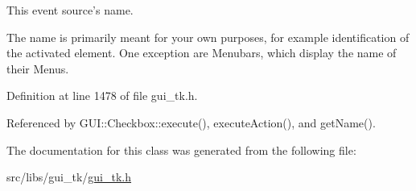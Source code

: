 This event source's name. 

The name is primarily meant for your own purposes, for example identification of the activated element. One exception are Menubars, which display the name of their Menus. 

Definition at line 1478 of file gui\-\_\-tk.\-h.



Referenced by G\-U\-I\-::\-Checkbox\-::execute(), execute\-Action(), and get\-Name().



The documentation for this class was generated from the following file\-:\begin{DoxyCompactItemize}
\item 
src/libs/gui\-\_\-tk/\hyperlink{gui__tk_8h}{gui\-\_\-tk.\-h}\end{DoxyCompactItemize}
